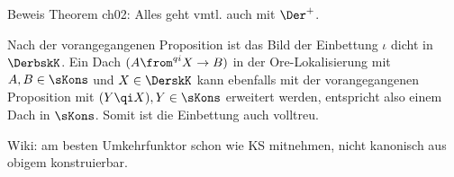 Beweis Theorem ch02: Alles geht vmtl. auch mit $\Der^+$.

Nach der vorangegangenen Proposition ist das Bild der Einbettung
$\iota$ dicht in $\DerbskK$. Ein Dach $(A \from^{qi} X \to B)$ in der
Ore-Lokalisierung mit $A,B \in \sKons$ und $X \in \DerskK$ kann
ebenfalls mit der vorangegangenen Proposition mit $(Y \qi X),
Y \in \sKons$ erweitert werden, entspricht also einem Dach in
$\sKons$. Somit ist die Einbettung auch volltreu.

Wiki: am besten Umkehrfunktor schon wie KS mitnehmen, nicht kanonisch
aus obigem konstruierbar.
